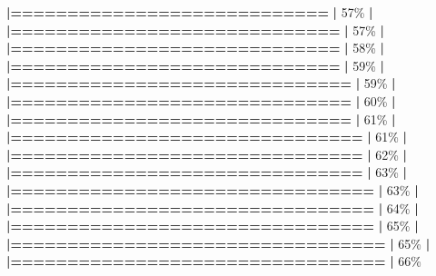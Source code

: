\documentclass[
]{book}
\newenvironment{Shaded}{\begin{snugshade}}{\end{snugshade}}
\newcommand{\DecValTok}[1]{\textcolor[rgb]{0.00,0.00,0.81}{#1}}
\newcommand{\ErrorTok}[1]{\textcolor[rgb]{0.64,0.00,0.00}{\textbf{#1}}}
\newcommand{\NormalTok}[1]{#1}
\newcommand{\SpecialCharTok}[1]{\textcolor[rgb]{0.81,0.36,0.00}{\textbf{#1}}}
\begin{document}
\begin{Shaded}
\begin{Highlighting}[]
  \ErrorTok{|============================}                      \ErrorTok{|}  \DecValTok{57}\NormalTok{\%}
  \SpecialCharTok{|}                                                        
  \ErrorTok{|=============================}                     \ErrorTok{|}  \DecValTok{57}\NormalTok{\%}
  \SpecialCharTok{|}                                                        
  \ErrorTok{|=============================}                     \ErrorTok{|}  \DecValTok{58}\NormalTok{\%}
  \SpecialCharTok{|}                                                        
  \ErrorTok{|=============================}                     \ErrorTok{|}  \DecValTok{59}\NormalTok{\%}
  \SpecialCharTok{|}                                                        
  \ErrorTok{|==============================}                    \ErrorTok{|}  \DecValTok{59}\NormalTok{\%}
  \SpecialCharTok{|}                                                        
  \ErrorTok{|==============================}                    \ErrorTok{|}  \DecValTok{60}\NormalTok{\%}
  \SpecialCharTok{|}                                                        
  \ErrorTok{|==============================}                    \ErrorTok{|}  \DecValTok{61}\NormalTok{\%}
  \SpecialCharTok{|}                                                        
  \ErrorTok{|===============================}                   \ErrorTok{|}  \DecValTok{61}\NormalTok{\%}
  \SpecialCharTok{|}                                                        
  \ErrorTok{|===============================}                   \ErrorTok{|}  \DecValTok{62}\NormalTok{\%}
  \SpecialCharTok{|}                                                        
  \ErrorTok{|===============================}                   \ErrorTok{|}  \DecValTok{63}\NormalTok{\%}
  \SpecialCharTok{|}                                                        
  \ErrorTok{|================================}                  \ErrorTok{|}  \DecValTok{63}\NormalTok{\%}
  \SpecialCharTok{|}                                                        
  \ErrorTok{|================================}                  \ErrorTok{|}  \DecValTok{64}\NormalTok{\%}
  \SpecialCharTok{|}                                                        
  \ErrorTok{|================================}                  \ErrorTok{|}  \DecValTok{65}\NormalTok{\%}
  \SpecialCharTok{|}                                                        
  \ErrorTok{|=================================}                 \ErrorTok{|}  \DecValTok{65}\NormalTok{\%}
  \SpecialCharTok{|}                                                        
  \ErrorTok{|=================================}                 \ErrorTok{|}  \DecValTok{66}\NormalTok{\%}

\end{Highlighting}
\end{Shaded}
\end{document}
